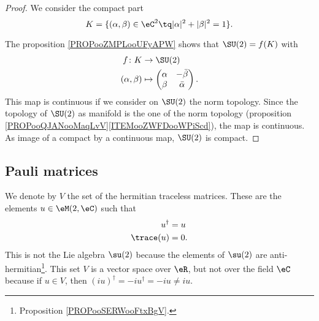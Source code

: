 \begin{proof}
	We consider the compact part
	\begin{equation}
		K=\{ (\alpha,\beta)\in \eC^2\tq | \alpha |^2+| \beta |^2=1 \}.
	\end{equation}

	The proposition \ref{PROPooZMPLooUFyAPW} shows that \( \SU(2)=f(K)\) with
	\begin{equation}
		\begin{aligned}
			f\colon K      & \to \SU(2)                   \\
			(\alpha,\beta) & \mapsto \begin{pmatrix}
				                         \alpha & -\bar\beta  \\
				                         \beta  & \bar \alpha
			                         \end{pmatrix}.
		\end{aligned}
	\end{equation}
	This map is continuous if we consider on \( \SU(2)\) the norm topology. Since the topology of \( \SU(2)\) as manifold is the one of the norm topology (proposition \ref{PROPooQJANooMaqLvV}\ref{ITEMooZWFDooWPiScd}), the map is continuous. As image of a compact by a continuous map, \( \SU(2)\) is compact.
\end{proof}

\subsection{Pauli matrices}

We denote by \( V\) the set of the hermitian traceless matrices. These are the elements \( u\in \eM(2,\eC)\) such that
\begin{subequations}
	\begin{align}
		u^{\dag}  & =u  \\
		\trace(u) & =0.
	\end{align}
\end{subequations}
This is not the Lie algebra \( \su(2)\) because the elements of \( \su(2)\) are anti-hermitian\footnote{Proposition \ref{PROPooSERWooFtxBgV}.}. This set \( V\) is a vector space over \( \eR\), but not over the field \( \eC\) because if \( u\in V\), then \( (iu)^{\dag}=-iu^{\dag}=-iu\neq iu\).

